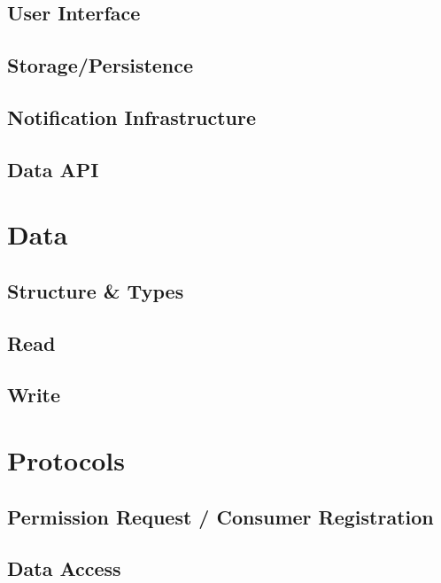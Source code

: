 \documentclass[12pt,english,a4paper,titlepage,cleardoublepage=empty,dottedtoc]{report}
\begin{document}
\subsection{User Interface}\label{user-interface}

\subsection{Storage/Persistence}\label{storagepersistence}

\subsection{Notification
Infrastructure}\label{notification-infrastructure}

\subsection{Data API}\label{data-api}

\section{Data}\label{data-1}

\subsection{Structure \& Types}\label{structure-types}

\subsection{Read}\label{read}

\subsection{Write}\label{write}

\section{Protocols}\label{protocols}

\subsection{Permission Request / Consumer
Registration}\label{permission-request-consumer-registration}

\subsection{Data Access}\label{data-access}
\end{document}
